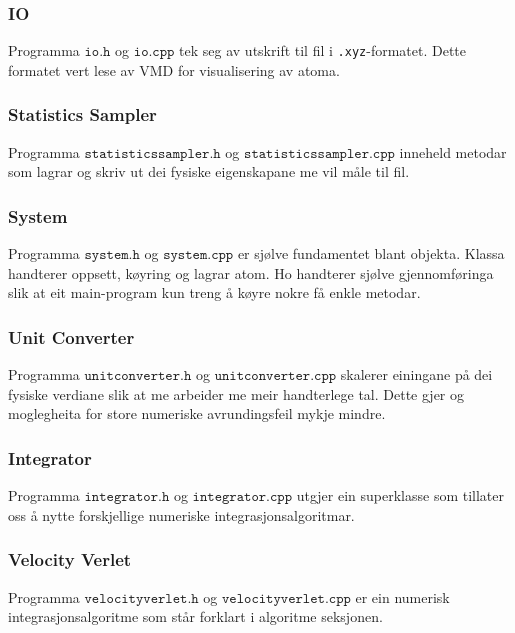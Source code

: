 \documentclass[12pt, a4paper]{article}
\theoremstyle{definition} \newtheorem*{definition}{Teorem}
\begin{document}
        \subsubsection*{IO}
            Programma $\texttt{io.h}$ og $\texttt{io.cpp}$ tek seg av utskrift til fil i \verb!.xyz!-formatet. Dette formatet vert lese av VMD for visualisering av atoma.

        \subsubsection*{Statistics Sampler}
            Programma $\texttt{statisticssampler.h}$ og $\texttt{statisticssampler.cpp}$ inneheld metodar som lagrar og skriv ut dei fysiske eigenskapane me vil måle til fil.

        \subsubsection*{System}
            Programma $\texttt{system.h}$ og $\texttt{system.cpp}$ er sjølve fundamentet blant objekta. Klassa handterer oppsett, køyring og lagrar atom. Ho handterer 
            sjølve gjennomføringa slik at eit main-program kun treng å køyre nokre få enkle metodar.

        \subsubsection*{Unit Converter}
            Programma $\texttt{unitconverter.h}$ og $\texttt{unitconverter.cpp}$ skalerer einingane på dei fysiske verdiane slik at me arbeider me meir handterlege tal.
            Dette gjer og moglegheita for store numeriske avrundingsfeil mykje mindre.

        \subsubsection*{Integrator}
            Programma $\texttt{integrator.h}$ og $\texttt{integrator.cpp}$ utgjer ein superklasse som tillater oss å nytte forskjellige numeriske integrasjonsalgoritmar.

        \subsubsection*{Velocity Verlet}
            Programma $\texttt{velocityverlet.h}$ og $\texttt{velocityverlet.cpp}$ er ein numerisk integrasjonsalgoritme som står forklart i algoritme seksjonen.
\end{document}

